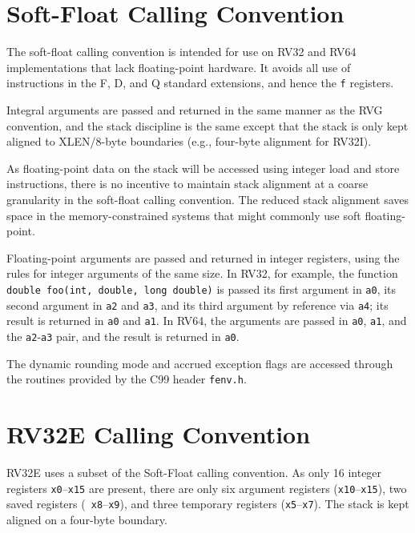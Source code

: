 \section{Soft-Float Calling Convention}

The soft-float calling convention is intended for use on RV32 and RV64
implementations that lack floating-point hardware.  It avoids all use
of instructions in the F, D, and Q standard extensions, and hence the
{\tt f} registers.

Integral arguments are passed and returned in the same manner as the
RVG convention, and the stack discipline is the same except that the
stack is only kept aligned to XLEN/8-byte boundaries (e.g., four-byte
alignment for RV32I).

\begin{commentary}
  As floating-point data on the stack will be accessed using integer
  load and store instructions, there is no incentive to maintain stack
  alignment at a coarse granularity in the soft-float calling
  convention.  The reduced stack alignment saves space in the
  memory-constrained systems that might commonly use soft
  floating-point.
\end{commentary}

Floating-point arguments are passed and returned in integer registers,
using the rules for integer arguments of the same size.  In RV32, for
example, the function {\tt double foo(int, double, long double)} is
passed its first argument in {\tt a0}, its second argument in {\tt a2}
and {\tt a3}, and its third argument by reference via {\tt a4}; its
result is returned in {\tt a0} and {\tt a1}.  In RV64, the arguments
are passed in {\tt a0}, {\tt a1}, and the {\tt a2}-{\tt a3} pair, and
the result is returned in {\tt a0}.

The dynamic rounding mode and accrued exception flags are accessed through
the routines provided by the C99 header {\tt fenv.h}.

\section{RV32E Calling Convention}

RV32E uses a subset of the Soft-Float calling convention.  As only 16
integer registers {\tt x0}--{\tt x15} are present, there are only six
argument registers ({\tt x10}--{\tt x15}), two saved registers ({\tt
  x8}--{\tt x9}), and three temporary registers ({\tt x5}--{\tt x7}).
The stack is kept aligned on a four-byte boundary.
